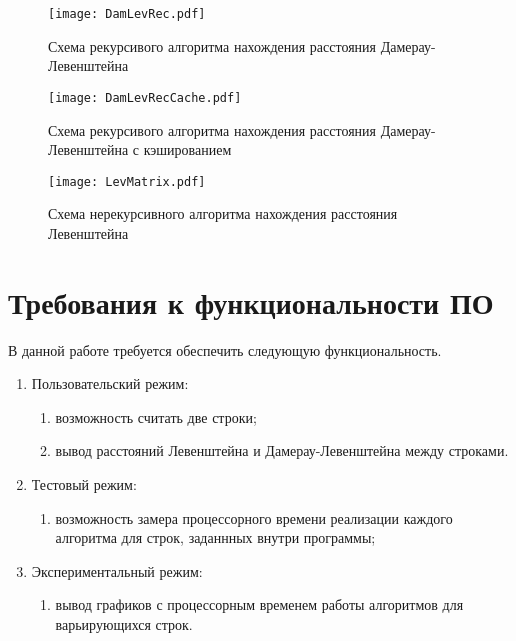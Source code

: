        	\begin{figure}[h!]
       		\centering
		\texttt{[image: DamLevRec.pdf]}
       		\caption{Схема рекурсивого алгоритма нахождения расстояния Дамерау-Левенштейна}
       		\label{schema:rec:DamLevenstein} 
       	\end{figure}\clearpage
       	
       	\begin{figure}[h!]
       		\centering
		\texttt{[image: DamLevRecCache.pdf]}
       		\caption{Схема рекурсивого алгоритма нахождения расстояния Дамерау-Левенштейна с кэшированием}
       		\label{schema:rec-matr:DamLevenstein}
       	\end{figure}\clearpage
       	
       	\begin{figure}[h!]
       		\centering
		\texttt{[image: LevMatrix.pdf]}
       		\caption{Схема нерекурсивного алгоритма нахождения расстояния Левенштейна}
       		\label{schema:matr:Levenstein}
       	\end{figure}\clearpage

    \section{Требования к функциональности ПО}
        В данной работе требуется обеспечить следующую функциональность.
        \begin{enumerate}
            \item Пользовательский режим:
            \begin{enumerate}
                \item возможность считать две строки;
                \item вывод расстояний Левенштейна и Дамерау-Левенштейна между строками.
            \end{enumerate}
	\item Тестовый режим: 
            \begin{enumerate}
            	\item возможность замера процессорного времени реализации каждого алгоритма для строк, заданнных внутри программы;
            \end{enumerate}
            \item Экспериментальный режим: 
            \begin{enumerate}
                \item вывод графиков с процессорным временем работы алгоритмов для варьирующихся строк.
            \end{enumerate}
        \end{enumerate}
        

